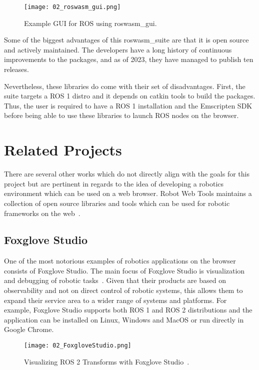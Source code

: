         \begin{figure}[htbp]
            \centering
            \texttt{[image: 02\_roswasm\_gui.png]}
            \caption{Example \ac{GUI} for ROS using \textsf{roswasm\_gui}.}
            \label{fig:roswasm_gui}
        \end{figure}

        Some of the biggest advantages of this \textsf{roswasm\_suite} are that it is open source and actively maintained. The developers have a long history of continuous improvements to the packages, and as of 2023, they have managed to publish ten releases. 

        Nevertheless, these libraries do come with their set of disadvantages. First, the suite targets a \ac{ROS} 1 distro and it depends on \textsf{catkin} tools to build the packages. Thus, the user is required to have a \ac{ROS} 1 installation and the Emscripten \ac{SDK} before being able to use these libraries to launch \ac{ROS} nodes on the browser.


\section{Related Projects}

    There are several other works which do not directly align with the goals for this project but are pertinent in regards to the idea of developing a robotics environment which can be used on a web browser. Robot Web Tools maintains a collection of open source libraries and tools which can be used for robotic frameworks on the web~\cite{robotwebtools}.
    
    \subsection{Foxglove Studio}

        One of the most notorious examples of robotics applications on the browser consists of Foxglove Studio. The main focus of Foxglove Studio is visualization and debugging of robotic tasks~\cite{foxglove}. Given that their products are based on observability and not on direct control of robotic systems, this allows them to expand their service area to a wider range of systems and platforms. For example, Foxglove Studio supports both \ac{ROS} 1 and \ac{ROS} 2 distributions and the application can be installed on Linux, Windows and MacOS or run directly in Google Chrome.
        
        \begin{figure}[htbp]
            \centering
            \texttt{[image: 02\_FoxgloveStudio.png]}
            \caption{Visualizing ROS 2 Transforms with Foxglove Studio~\cite{transforms}.}
            \label{fig:foxglove}
        \end{figure}

